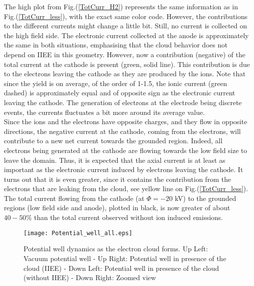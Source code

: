 The high plot from Fig.(\ref{TotCurr_H2}) represents the same information as in Fig.(\ref{TotCurr_less}), with the exact same color code. However, the contributions to the different currents might change a little bit. Still, no current is collected on the high field side. The electronic current collected at the anode is approximately the same in both situations, emphasising that the cloud behavior does not depend on IIEE in this geometry. However, now a contribution (negative) of the total current at the cathode is present (green, solid line). This contribution is due to the electrons leaving the cathode as they are produced by the ions. Note that since the yield is on average, of the order of 1-1.5, the ionic current (green dashed) is approximately equal and of opposite sign as the electronic current leaving the cathode. The generation of electrons at the electrode being discrete events, the currents fluctuates a bit more around its average value. \\

\noindent Since the ions and the electrons have opposite charges, and they flow in opposite directions, the negative current at the cathode, coming from the electrons, will contribute to a new net current towards the grounded region. Indeed, all electrons being generated at the cathode are flowing towards the low field size to leave the domain. Thus, it is expected that the axial current is at least as important as the electronic current induced by electrons leaving the cathode. It turns out that it is even greater, since it contains the contribution from the electrons that are leaking from the cloud, see yellow line on Fig.(\ref{TotCurr_less}). The total current flowing from the cathode (at $\Phi = -20$ kV) to the grounded regions (low field side and anode), plotted in black, is now greater of about $40-50\%$ than the total current observed without ion induced emissions. \\

\begin{figure}[h!]
\centering
	\texttt{[image: Potential\_well\_all.eps]}
	\caption{\label{pot_well_all} Potential well dynamics as the electron cloud forms. Up Left: Vacuum potential well - Up Right: Potential well in presence of the cloud (IIEE) - Down Left: Potential well in presence of the cloud (without IIEE) - Down Right: Zoomed view}
\end{figure}

